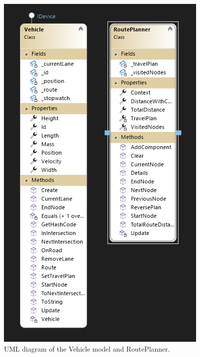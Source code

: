 \begin{figure}[h!]
	\centering
	\includegraphics[width=0.9\linewidth]{figures/Vehicle_and_routeplanner}
	\caption{UML diagram of the Vehicle model and RoutePlanner.}
	\label{fig:vehicleandrouteplanner}
\end{figure}


\clearpage
